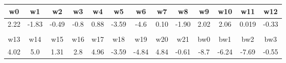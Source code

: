 \begin{tabular}{c | c | c | c | c | c | c | c | c | c | c | c | c }

w0  & w1  & w2  & w3  & w4  & w5  & w6  & w7  & w8  & w9  & w10 & w11 & w12 \\
\hline
2.22 & -1.83 & -0.49 & -0.8 & 0.88 & -3.59 & -4.6 & 0.10 & -1.90 & 2.02 & 2.06 & 0.019 & -0.33 \\ \\

w13 & w14 & w15 & w16 & w17 & w18 & w19 & w20 & w21 & bw0 & bw1 & bw2 & bw3 \\
\hline
4.02 & 5.0 & 1.31 & 2.8 & 4.96 & -3.59 & -4.84 & 4.84 & -0.61 & -8.7 & -6.24 & -7.69 & -0.55 \\

\end{tabular}
